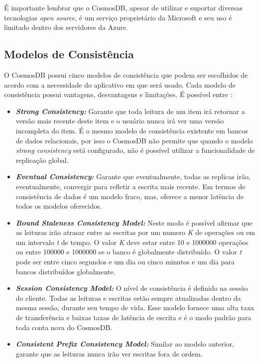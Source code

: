 \documentclass[12pt]{article}
\begin{document}
É importante lembrar que o CosmosDB, apesar de utilizar e suportar diversas tecnologias \textit{open source}, é um serviço proprietário da Microsoft e seu uso é limitado dentro dos 
servidores da Azure.

\subsection{Modelos de Consistência}
O CosmosDB possui cinco modelos de consistência que podem ser escolhidos de acordo com a necessidade do aplicativo em que será usado. Cada modelo de consistência possui vantagens, desvantagens e limitações.
É possível entre \cite{Paz2018} \cite{Shukla2015}:

\begin{itemize}
	\item \textbf{\textit{Strong Consistency:}} Garante que toda leitura de um item irá retornar a versão mais recente deste item e o usuário nunca irá ver uma versão incompleta do item. 
	É o mesmo modelo de consistência existente em bancos de dados relacionais, por isso o CosmosDB não permite que quando o modelo \textit{strong consistency} está configurado, não é possível utilizar a funcionalidade
	de replicação global.
	\item \textbf{\textit{Eventual Consistency:}} Garante que eventualmente, todas as replicas irão, eventualmente, convergir para refletir a escrita mais recente. Em termos de consistência de dados é um modelo fraco, mas,
	oferece a menor latência de todos os modelos oferecidos. 
	\item \textbf{\textit{Bound Staleness Consistency Model:}} Neste modo é possível afirmar que as leituras irão atrasar entre as escritas por um numero \textit{K} de operações ou em um intervalo \textit{t} de tempo. O valor \textit{K} deve estar entre
	10 e 1000000 operações ou entre 100000 e 1000000 se o banco é globalmente distribuído. O valor \textit{t} pode ser entre cinco segundos e um dia ou cinco minutos e um dia para bancos distribuídos globalmente.
	\item \textbf{\textit{Session Consistency Model:}} O nível de consistência é definido na sessão do cliente. Todas as leituras e escritas estão sempre atualizadas dentro da mesma sessão, durante seu tempo de vida. Esse modelo fornece uma
	alta taxa de transferência e baixas taxas de latência de escrita e é o modo padrão para toda conta nova do CosmosDB. 
	\item \textbf{\textit{Consistent Prefix Consistency Model:}} Similar ao modelo anterior, garante que as leituras nunca irão ver escritas fora de ordem. 
\end{itemize}
\end{document}
